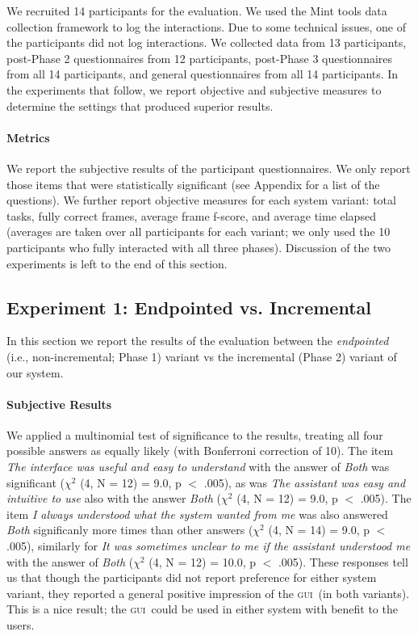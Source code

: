 \documentclass[11pt]{article}
\newcommand{\ui}[0]{\textsc{gui}}
\begin{document}
We recruited 14 participants for the evaluation. We used the Mint tools data collection framework \cite{kousidis2012evaluating} to log the interactions. Due to some technical issues, one of the participants did not log interactions. We collected data from 13 participants, post-Phase 2 questionnaires from 12 participants,  post-Phase 3 questionnaires from all 14 participants, and general questionnaires from all 14 participants. In the experiments that follow, we report objective and subjective measures to determine the settings that produced superior results.

\paragraph{Metrics} We report the subjective results of the participant questionnaires. We only report those items that were statistically significant (see Appendix for a list of the questions). We further report objective measures for each system variant: total tasks, fully correct frames, average frame f-score, and average time elapsed (averages are taken over all participants for each variant; we only used the 10 participants who fully interacted with all three phases). Discussion of the two experiments is left to the end of this section.

\subsection{Experiment 1: Endpointed vs. Incremental}
\label{section:exp1}

In this section we report the results of the evaluation between the \emph{endpointed} (i.e., non-incremental; Phase 1) variant vs the incremental (Phase 2) variant of our system.

\paragraph{Subjective Results} We applied a multinomial test of significance to the results, treating all four possible answers as equally likely (with Bonferroni correction of 10). The item \emph{The interface was useful and easy to understand} with the answer of \emph{Both} was significant ($ \chi^2 $ (4, N = 12) = 9.0, p $<$ .005), as was \emph{The assistant was easy and intuitive to use} also with the answer \emph{Both} ($ \chi^2 $ (4, N = 12) = 9.0, p $<$ .005). The item \emph{I always understood what the system wanted from me} was also answered \emph{Both} significanly more times than other answers ($ \chi^2 $ (4, N = 14) = 9.0, p $<$ .005), similarly for \emph{It was sometimes unclear to me if the assistant understood me} with the answer of \emph{Both} ($ \chi^2 $ (4, N = 12) = 10.0, p $<$ .005).  These responses tell us that though the participants did not report preference for either system variant, they reported a general positive impression of the \ui\ (in both variants). This is a nice result; the \ui\ could be used in either system with benefit to the users.
\end{document}
